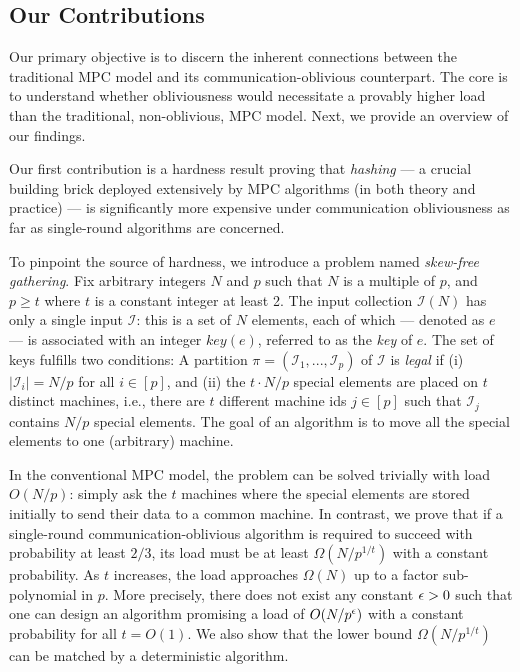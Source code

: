 \documentclass[sigconf]{acmart}
\def\vgap{\vspace{0mm}}
\def\extraspacing{\vspace{1mm} \noindent}
\def\I{\mathcal{I}}
\def\II{\mathscr{I}}
\def\key{\mathit{key}}
\begin{document}
\subsection{Our Contributions} \label{sec:intro:ours}

Our primary objective is to discern the inherent connections between the traditional MPC model and its communication-oblivious counterpart. The core is to understand whether obliviousness would necessitate a provably higher load than the traditional, non-oblivious, MPC model. Next, we provide an overview of our findings.

\extraspacing {\bf Single-Round Hashing.} Our first contribution is a hardness result proving that {\em hashing} --- a crucial building brick deployed extensively by MPC algorithms (in both theory and practice) --- is significantly more expensive under communication obliviousness as far as single-round algorithms are concerned.

\vgap

To pinpoint the source of hardness, we introduce a problem named {\em skew-free gathering}. Fix arbitrary integers $N$ and $p$ such that $N$ is a multiple of $p$, and $p \ge t$ where $t$ is a constant integer at least 2. The input collection $\II(N)$ has only a single input $\I$: this is a set of $N$ elements, each of which --- denoted as $e$ --- is associated with an integer $\key(e)$, referred to as the {\em key} of $e$. The set of keys fulfills two conditions:
A partition $\pi = (\I_1, ..., \I_p)$ of $\I$ is {\em legal} if (i) $|\I_i| = N/p$ for all $i \in [p]$, and (ii)
the $t \cdot N/p$ special elements are placed on $t$ distinct machines, i.e., there are $t$ different machine ids $j \in [p]$ such that $\I_j$ contains $N/p$ special elements. The goal of an algorithm is to move all the special elements to one (arbitrary) machine.

\vgap

In the conventional MPC model, the problem can be solved trivially with load $O(N/p)$: simply ask the $t$ machines where the special elements are stored initially to send their data to a common machine. In contrast, we prove that if a single-round communication-oblivious algorithm is required to succeed with probability at least $2/3$, its load must be at least $\Omega(N / p^{1/t})$ with a constant probability. As $t$ increases, the load approaches $\Omega(N)$ up to a factor sub-polynomial in $p$. More precisely, there does not exist any constant $\epsilon > 0$ such that one can design an algorithm promising a load of $O(N/p^\epsilon)$ with a constant probability for all $t = O(1)$. We also show that the lower bound $\Omega(N / p^{1/t})$ can be matched by a deterministic algorithm.
\end{document}
